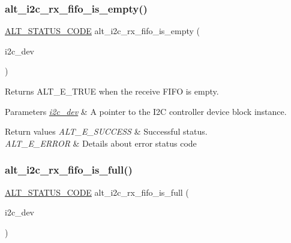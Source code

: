 \subsubsection{\texorpdfstring{alt\_i2c\_rx\_fifo\_is\_empty()}{alt\_i2c\_rx\_fifo\_is\_empty()}}
{\footnotesize\ttfamily \mbox{\hyperlink{hwlib_8h_abdb0d369f069723ca55d6c94bcaaaa12}{A\+L\+T\+\_\+\+S\+T\+A\+T\+U\+S\+\_\+\+C\+O\+DE}} alt\+\_\+i2c\+\_\+rx\+\_\+fifo\+\_\+is\+\_\+empty (\begin{DoxyParamCaption}\item[{\mbox{\hyperlink{structALT__I2C__DEV__s}{A\+L\+T\+\_\+\+I2\+C\+\_\+\+D\+E\+V\+\_\+t}} $\ast$}]{i2c\+\_\+dev }\end{DoxyParamCaption})}

Returns A\+L\+T\+\_\+\+E\+\_\+\+T\+R\+UE when the receive F\+I\+FO is empty.


\begin{DoxyParams}{Parameters}
{\em \mbox{\hyperlink{structi2c__dev}{i2c\+\_\+dev}}} & A pointer to the I2C controller device block instance.\\
\hline
\end{DoxyParams}

\begin{DoxyRetVals}{Return values}
{\em A\+L\+T\+\_\+\+E\+\_\+\+S\+U\+C\+C\+E\+SS} & Successful status. \\
\hline
{\em A\+L\+T\+\_\+\+E\+\_\+\+E\+R\+R\+OR} & Details about error status code \\
\hline
\end{DoxyRetVals}
\mbox{\label{group__ALT__I2C__RX__FIFO_gac1dd68ec990d8bb5ce40157855c4dd7b}} 
\subsubsection{\texorpdfstring{alt\_i2c\_rx\_fifo\_is\_full()}{alt\_i2c\_rx\_fifo\_is\_full()}}
{\footnotesize\ttfamily \mbox{\hyperlink{hwlib_8h_abdb0d369f069723ca55d6c94bcaaaa12}{A\+L\+T\+\_\+\+S\+T\+A\+T\+U\+S\+\_\+\+C\+O\+DE}} alt\+\_\+i2c\+\_\+rx\+\_\+fifo\+\_\+is\+\_\+full (\begin{DoxyParamCaption}\item[{\mbox{\hyperlink{structALT__I2C__DEV__s}{A\+L\+T\+\_\+\+I2\+C\+\_\+\+D\+E\+V\+\_\+t}} $\ast$}]{i2c\+\_\+dev }\end{DoxyParamCaption})}

